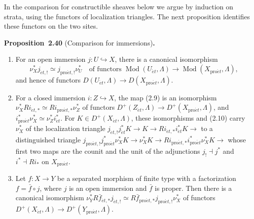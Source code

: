 \documentclass[11pt]{article}
\newenvironment{bpstatement}[2]{\par\addvspace{0.6\baselineskip}\noindent\textbf{#1}#2\textbf{.}\enspace\ignorespaces}
  {\par\addvspace{0.4\baselineskip}}
\newenvironment{bpstatementit}[2]{\begin{bpstatement}{#1}{#2}\itshape\ignorespaces}{\end{bpstatement}}
\begin{document}
\label{bp116}%
In the comparison for constructible sheaves below we argue by induction on strata, using the functors of localization triangles. The next proposition identifies these functors on the two sites.

\label{bp117}%
\begin{bpstatementit}{Proposition~2.40}{ (Comparison for immersions)}
\begin{enumerate}
\item For an open immersion \(j:U\hookrightarrow X\), there is a canonical isomorphism \[
   \nu_X^*j_{\acute{e}t,!}\simeq j_{\mathrm{pro}\acute{e}t,!}\nu_U^*\quad\text{of functors }\operatorname{Mod}(U_{\acute{e}t},\Lambda)\to\operatorname{Mod}(X_{\mathrm{pro}\acute{e}t},\Lambda),
   \tag{2.10}
   \] and hence of functors \(D(U_{\acute{e}t},\Lambda)\to D(X_{\mathrm{pro}\acute{e}t},\Lambda)\).
\item For a closed immersion \(i:Z\hookrightarrow X\), the map (2.9) is an isomorphism \(\nu_X^*Ri_{\acute{e}t,*}\simeq Ri_{\mathrm{pro}\acute{e}t,*}\nu_Z^*\) of functors \(D^+(Z_{\acute{e}t},\Lambda)\to D^+(X_{\mathrm{pro}\acute{e}t},\Lambda)\), and \(i_{\mathrm{pro}\acute{e}t}^*\nu_X^*\simeq\nu_Z^*i_{\acute{e}t}^*\). For \(K\in D^+(X_{\acute{e}t},\Lambda)\), these isomorphisms and (2.10) carry \(\nu_X^*\) of the localization triangle \(j_{\acute{e}t,!}j_{\acute{e}t}^*K\to K\to Ri_{\acute{e}t,*}i_{\acute{e}t}^*K\to\) to a distinguished triangle \(j_{\mathrm{pro}\acute{e}t,!}j_{\mathrm{pro}\acute{e}t}^*\nu_X^*K\to\nu_X^*K\to Ri_{\mathrm{pro}\acute{e}t,*}i_{\mathrm{pro}\acute{e}t}^*\nu_X^*K\to\) whose first two maps are the counit and the unit of the adjunctions \(j_!\dashv j^*\) and \(i^*\dashv Ri_*\) on \(X_{\mathrm{pro}\acute{e}t}\).
\item Let \(f:X\to Y\) be a separated morphism of finite type with a factorization \(f=\bar f\circ j\), where \(j\) is an open immersion and \(\bar f\) is proper. Then there is a canonical isomorphism \(\nu_Y^*R\bar f_{\acute{e}t,*}j_{\acute{e}t,!}\simeq R\bar f_{\mathrm{pro}\acute{e}t,*}j_{\mathrm{pro}\acute{e}t,!}\nu_X^*\) of functors \(D^+(X_{\acute{e}t},\Lambda)\to D^+(Y_{\mathrm{pro}\acute{e}t},\Lambda)\).
\end{enumerate}
\end{bpstatementit}
\end{document}
